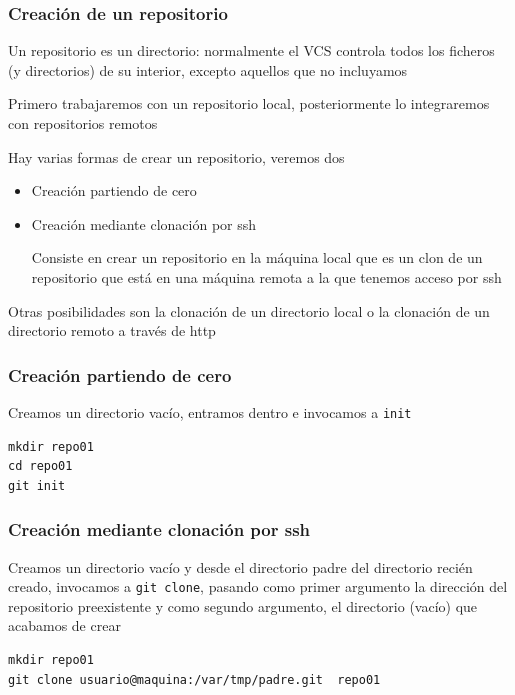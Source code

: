 \documentclass[ucs]{beamer}
\begin{document}
\begin{frame}[fragile]
\frametitle{Creación de un repositorio }

Un repositorio es un directorio: normalmente el VCS controla
todos los ficheros (y directorios) de su interior, excepto 
aquellos que no incluyamos


Primero trabajaremos con un repositorio local, 
posteriormente lo integraremos con repositorios remotos

Hay varias formas de crear un repositorio, veremos dos


\begin{itemize}
\item
Creación partiendo de cero
\item
Creación mediante clonación por ssh

Consiste en crear un repositorio en la máquina local que es un clon
de un repositorio que está en una máquina remota a la que tenemos
acceso por ssh
\end{itemize}

Otras posibilidades son la clonación de un directorio local
o la clonación de un directorio remoto a través de http


\end{frame}
\begin{frame}[fragile]

\frametitle{Creación partiendo de cero}


Creamos un directorio vacío, entramos dentro e invocamos a \verb|init|
  \begin{footnotesize}
  \begin{verbatim}
mkdir repo01
cd repo01
git init
  \end{verbatim}
  \end{footnotesize}


\end{frame}

\begin{frame}[fragile]
\frametitle{Creación mediante clonación por ssh}
Creamos un directorio vacío y desde el directorio padre
del directorio recién creado, invocamos a \verb|git clone|, pasando como primer argumento la dirección
del repositorio preexistente y como segundo argumento, el directorio (vacío) que acabamos de crear

  \begin{footnotesize}
  \begin{verbatim}
mkdir repo01
git clone usuario@maquina:/var/tmp/padre.git  repo01
  \end{verbatim}
  \end{footnotesize}


\end{frame}
\end{document}
